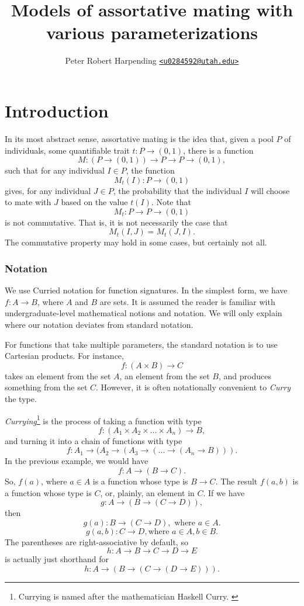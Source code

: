 \documentclass[12pt,letterpaper,oneside]{memoir}
\makeatletter
\newcommand{\code}[1]{\texttt{#1}}
\newcommand{\email}[1]{\href{mailto:#1}{\code{<#1>}}}
\newcommand{\person}[2]{#1 \email{#2}}
\newcommand{\pharpend}{\person{Peter Robert Harpending}{u0284592@utah.edu}}
\theoremstyle{definition}
\makeatother
\begin{document}
\title{Models of assortative mating with various parameterizations}
\author{\pharpend}
\date{\Today}
\maketitle

\tableofcontents

\chapter{Introduction}

In its most abstract sense, assortative mating is the idea that, given a pool
$P$ of individuals, some quantifiable trait $t : P \to (0, 1)$, there is a function
$$M : (P \to (0, 1)) \to P \to P \to (0, 1),$$ such that for any individual $I
\in P$, the function $$M_t(I) : P \to (0, 1)$$ gives, for any individual
$J \in P$, the probability that the individual $I$ will choose to mate with $J$
based on the value $t(I)$. \cite{needed} Note that $$M_t : P \to P \to (0, 1)$$
is not commutative. \cite{needed} That is, it is not necessarily the case that
$$M_t(I, J) = M_t(J, I).$$ The commutative property may hold in some cases, but
certainly not all.

\subsection{Notation}

We use Curried notation for function signatures. In the simplest form, we have
$f : A \to B$, where $A$ and $B$ are sets. It is assumed the reader is familiar
with undergraduate-level mathematical notions and notation. We will only explain
where our notation deviates from standard notation.

For functions that take multiple parameters, the standard notation is to use
Cartesian products. For instance, $$f : (A \times B) \to C$$ takes an element
from the set $A$, an element from the set $B$, and produces something from the
set $C$. However, it is often notationally convenient to \emph{Curry} the
type.

\emph{Currying}\footnote{Currying is named after the mathematician Haskell
  Curry. \cite{needed}} is the process of taking a function with type
$$f : (A_1 \times A_2 \times \dots \times A_n) \to B,$$ and turning it into a
chain of functions with type
$$f : A_1 \to (A_2 \to (A_3 \to (\dots \to (A_n \to B))).$$ In the previous
example, we would have $$f : A \to (B \to C).$$ So, $f(a)$, where $a \in A$ is a
function whose type is $B \to C$. The result $f(a, b)$ is a function whose type
is $C$, or, plainly, an element in $C$. If we have
$$g : A \to (B \to (C \to D)),$$ then
$$g(a) : B \to (C \to D), \text{ where } a \in A.$$ $$g(a, b) : C \to D, \text{
  where } a \in A, b \in B.$$ The parentheses are right-associative by default,
so $$h : A \to B \to C \to D \to E$$ is actually just shorthand for
$$h : A \to (B \to (C \to (D \to E))).$$

\printbibliography
\end{document}
